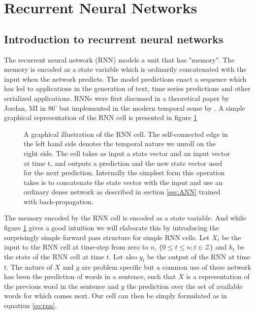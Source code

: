 
\section{Recurrent Neural Networks}\label{sec:rnn}

\subsection{Introduction to recurrent neural networks}

The recurrent neural network (RNN) models a unit that has "memory". The memory is encoded as a state variable which is ordinarily concatenated with the input when the network predicts. The model predictions enact a sequence which has led to applications in the generation of text, time series predictions and other serialized applications. RNNs were first discussed in a theoretical paper by Jordan, MI in 86' but implemented in the modern temporal sense by \citet{Pearlmutter1989}. A simple graphical representation of the RNN cell is presented in figure \ref{fig:rnn}

\begin{figure}[h]
\centering
{} %

\caption{A graphical illustration of the RNN cell. The self-connected edge in the left hand side denotes the temporal nature we unroll on the right side. The cell takes as input a state vector and an input vector at time t, and outputs a prediction and the new state vector used for the next prediction. Internally the simplest form this operation takes is to concatenate the state vector with the input and use an ordinary dense network as described in section \ref{sec:ANN} trained with back-propagation.}\label{fig:rnn}
\end{figure}

The memory encoded by the RNN cell is encoded as a state variable. And while figure \ref{fig:rnn} gives a good intuition we will elaborate this by introducing the surprisingly simple forward pass structure for simple RNN cells. Let $X_t$ be the input to the RNN cell at time-step from zero to $n$, $\{0 \leq t \leq n: t \in \mathcal{Z} \}$ and $h_t$ be the state of the RNN cell at time $t$. Let also $y_t$ be the output of the RNN at time $t$. The nature of $X$ and $y$ are problem specific but a common use of these network has been the prediction of words in a sentence, such that $X$ is a representation of the previous word in the sentence and $y$ the prediction over the set of available words for which comes next. Our cell can then be simply formulated as in equation \ref{eq:rnn}.

